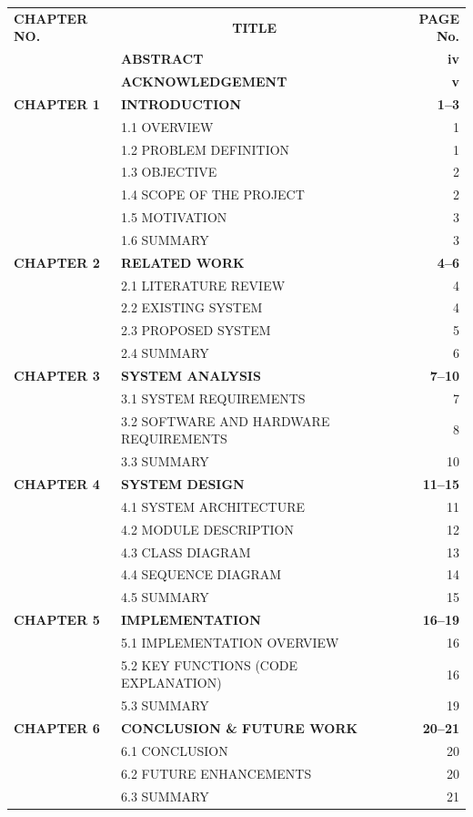 \documentclass[12pt,a4paper,oneside]{report}
\begin{document}
\noindent
\begin{tabularx}{\textwidth}{@{}p{3.2cm}X r@{}}
\textbf{CHAPTER NO.} & \multicolumn{1}{c}{\textbf{TITLE}} & \textbf{PAGE No.} \\[0.3cm]
& \textbf{ABSTRACT} & \textbf{iv} \\
& \textbf{ACKNOWLEDGEMENT} & \textbf{v} \\
\textbf{CHAPTER 1} & \textbf{INTRODUCTION} & \textbf{1--3} \\
& 1.1 OVERVIEW & 1 \\
& 1.2 PROBLEM DEFINITION & 1 \\
& 1.3 OBJECTIVE & 2 \\
& 1.4 SCOPE OF THE PROJECT & 2 \\
& 1.5 MOTIVATION & 3 \\
& 1.6 SUMMARY & 3 \\
\textbf{CHAPTER 2} & \textbf{RELATED WORK} & \textbf{4--6} \\
& 2.1 LITERATURE REVIEW & 4 \\
& 2.2 EXISTING SYSTEM & 4 \\
& 2.3 PROPOSED SYSTEM & 5 \\
& 2.4 SUMMARY & 6 \\
\textbf{CHAPTER 3} & \textbf{SYSTEM ANALYSIS} & \textbf{7--10} \\
& 3.1 SYSTEM REQUIREMENTS & 7 \\
& 3.2 SOFTWARE AND HARDWARE REQUIREMENTS & 8 \\
& 3.3 SUMMARY & 10 \\
\textbf{CHAPTER 4} & \textbf{SYSTEM DESIGN} & \textbf{11--15} \\
& 4.1 SYSTEM ARCHITECTURE & 11 \\
& 4.2 MODULE DESCRIPTION & 12 \\
& 4.3 CLASS DIAGRAM & 13 \\
& 4.4 SEQUENCE DIAGRAM & 14 \\
& 4.5 SUMMARY & 15 \\
\textbf{CHAPTER 5} & \textbf{IMPLEMENTATION} & \textbf{16--19} \\
& 5.1 IMPLEMENTATION OVERVIEW & 16 \\
& 5.2 KEY FUNCTIONS (CODE EXPLANATION) & 16 \\
& 5.3 SUMMARY & 19 \\
\textbf{CHAPTER 6} & \textbf{CONCLUSION \& FUTURE WORK} & \textbf{20--21} \\
& 6.1 CONCLUSION & 20 \\
& 6.2 FUTURE ENHANCEMENTS & 20 \\
& 6.3 SUMMARY & 21 \\
\end{tabularx}
\end{document}
